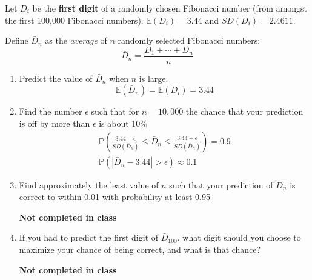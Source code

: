 \documentclass[titlepage, 12pt, leqno]{article}
\begin{document}
\begin{ex}
    Let $D_i$ be the \textbf{first digit} of a randomly chosen Fibonacci number
    (from amongst the first 100,000 Fibonacci numbers). $ \mathbb{E}(D_i) = 3.44$
    and $SD(D_i) = 2.4611$.
    \vspace{10px}

    Define $ \bar D_n$ as the \textit{average} of $n$ randomly selected Fibonacci
    numbers:
    \[
    \bar D_n = \frac{D_1 + \cdots + D_n}{n}
    \]
    \begin{enumerate}
        \item Predict the value of $ \bar D_n$ when $n$ is large.
            \[
                \mathbb{E}( \bar D_n) = \mathbb{E}(D_i) = \boxed{3.44}
            \]
        \item Find the number $\epsilon$ such that for $n=10,000$ the chance
            that your prediction is off by more than $\epsilon$ is about 10\%
           \begin{align*}
               \mathbb{P}\left(\frac{3.44-\epsilon}{SD( \bar D_n)} \le \bar D_n
                   \le \frac{3.44+\epsilon}{SD( \bar D_n)}\right) = 0.9 \\
                   \mathbb{P}(| \bar D_n - 3.44| > \epsilon) \approx 0.1
           \end{align*}

        \item Find approximately the least value of $n$ such that your prediction
            of $ \bar D_n$ is correct to within 0.01 with probability at least
            0.95

            \textbf{Not completed in class}
            \vspace{10px}

        \item If you had to predict the first digit of $ \bar D_{100}$, what 
            digit should you choose to maximize your chance of being correct, and
            what is that chance?

            \textbf{Not completed in class}
    \end{enumerate}
\end{ex}
\end{document}
